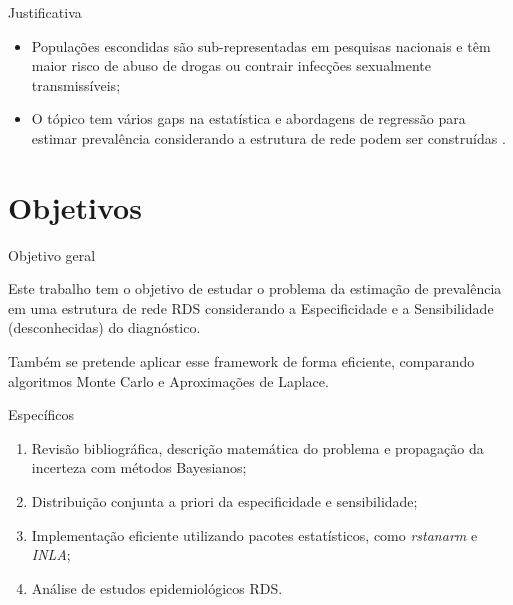 \documentclass{beamer}
\newcommand{\Space}{\vspace{3ex}}
\begin{document}
\begin{frame}{Justificativa}
  \begin{itemize}

    \justifying

    \item Populações escondidas são sub-representadas em pesquisas nacionais e
    têm maior risco de abuso de drogas ou contrair infecções sexualmente
    transmissíveis;

    \Space
    
    \item O tópico tem vários gaps na estatística e abordagens de regressão
    para estimar prevalência considerando a estrutura de rede podem ser
    construídas \cite{bastos2012binary}.
  \end{itemize}
\end{frame}



\section{Objetivos}

\begin{frame}{Objetivo geral}

  \justifying

  Este trabalho tem o objetivo de estudar o problema da estimação de
  prevalência em uma estrutura de rede RDS considerando a Especificidade e a
  Sensibilidade (desconhecidas) do diagnóstico. 

  \Space
  
  Também se pretende aplicar esse framework de
  forma eficiente, comparando algoritmos Monte Carlo e Aproximações de Laplace. 
\end{frame}

\begin{frame}{Específicos}

  \begin{enumerate}

    \justifying

    \item Revisão bibliográfica, descrição matemática do problema e propagação
    da incerteza com métodos Bayesianos; 

    \Space

    \item Distribuição conjunta a priori da especificidade e sensibilidade;
    
    \Space

    \item Implementação eficiente utilizando pacotes estatísticos, como {\em rstanarm} e {\em INLA};
    
    \Space

    \item Análise de estudos epidemiológicos RDS.
  \end{enumerate}
  
\end{frame}
\end{document}
